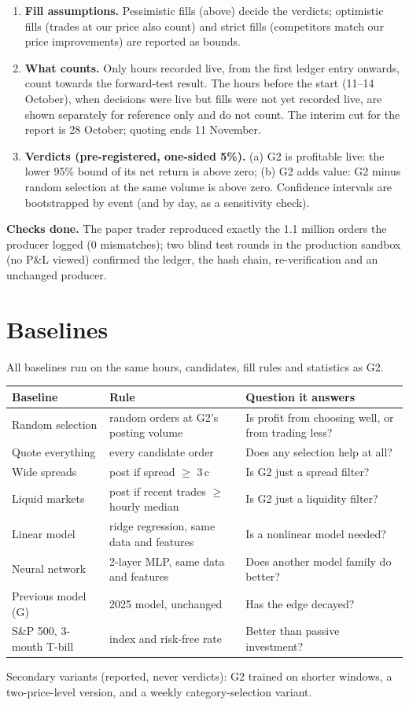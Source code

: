 \documentclass[11pt,a4paper]{article}
\begin{document}
\begin{enumerate}[leftmargin=*]
    plus the ledger entry's hash. Hourly P\&L is the change in total P\&L.
  \item \textbf{Fill assumptions.} Pessimistic fills (above) decide the verdicts; optimistic fills (trades at our
    price also count) and strict fills (competitors match our price improvements) are reported as bounds.
  \item \textbf{What counts.} Only hours recorded live, from the first ledger entry onwards, count towards the
    forward-test result. The hours before the start (11--14 October), when decisions were live but fills were not
    yet recorded live, are shown separately for reference only and do not count. The interim cut for the report is
    28 October; quoting ends 11 November.
  \item \textbf{Verdicts (pre-registered, one-sided 5\%).} (a) G2 is profitable live: the lower 95\% bound of its net
    return is above zero; (b) G2 adds value: G2 minus random selection at the same volume is above zero. Confidence
    intervals are bootstrapped by event (and by day, as a sensitivity check).
\end{enumerate}
\noindent\textbf{Checks done.} The paper trader reproduced exactly the 1.1 million orders the producer logged
(0 mismatches); two blind test rounds in the production sandbox (no P\&L viewed) confirmed the ledger, the hash
chain, re-verification and an unchanged producer.

\section{Baselines}\label{sec:baselines}
All baselines run on the same hours, candidates, fill rules and statistics as G2.
\begin{center}
\small
\begin{tabular}{@{}p{3.0cm}p{5.5cm}p{7.0cm}@{}}
\toprule
Baseline & Rule & Question it answers \\
\midrule
Random selection & random orders at G2's posting volume & Is profit from choosing well, or from trading less? \\
Quote everything & every candidate order & Does any selection help at all? \\
Wide spreads & post if spread $\ge$ 3\,c & Is G2 just a spread filter? \\
Liquid markets & post if recent trades $\ge$ hourly median & Is G2 just a liquidity filter? \\
Linear model & ridge regression, same data and features & Is a nonlinear model needed? \\
Neural network & 2-layer MLP, same data and features & Does another model family do better? \\
Previous model (G) & 2025 model, unchanged & Has the edge decayed? \\
S\&P 500, 3-month T-bill & index and risk-free rate & Better than passive investment? \\
\bottomrule
\end{tabular}
\end{center}
Secondary variants (reported, never verdicts): G2 trained on shorter windows, a two-price-level version, and a
weekly category-selection variant.
\end{document}
